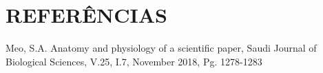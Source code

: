 \documentclass[
12pt,		%
openright,	%
twoside,  %
a4paper,			%
chapter=TITLE,		%
english,			%
french,				%
spanish,			%
brazil				%
]{USPSC-classe/USPSC}
\begin{document}
\chapter[REFER\^ENCIAS]{REFER\^ENCIAS}\label{REFER\^ENCIAS}
\begin{flushleft}
\begin{flushleft}
\begin{flushleft}
\begin{flushleft}
\begin{flushleft}
\begin{flushleft}
\begin{flushleft}
\begin{flushleft}
\begin{flushleft}
\begin{flushleft}
\begin{flushleft}
\begin{flushleft}
\begin{flushleft}
\begin{flushleft}
\begin{flushleft}
\begin{flushleft}
\begin{flushleft}
[MEO, 2018] Meo, S.A. Anatomy and physiology of a scientific paper, Saudi Journal of Biological Sciences, V.25, I.7, November 2018, Pg. 1278-1283
\end{flushleft}


\end{flushleft}


\end{flushleft}


\end{flushleft}


\end{flushleft}


\end{flushleft}


\end{flushleft}


\end{flushleft}


\end{flushleft}


\end{flushleft}


\end{flushleft}


\end{flushleft}


\end{flushleft}


\end{flushleft}


\end{flushleft}


\end{flushleft}


\end{flushleft}
\end{document}
